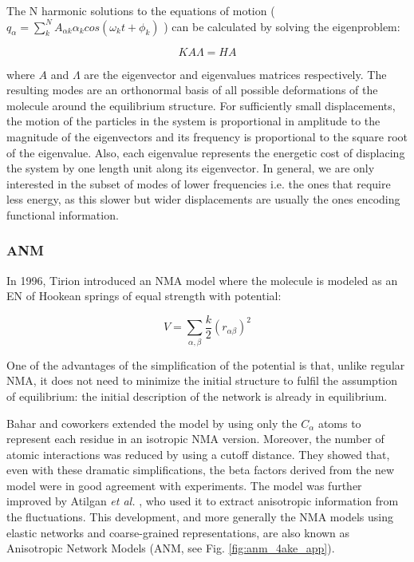 The N harmonic solutions to the equations of motion ($q_\alpha = \sum_k^N A_{\alpha k } \alpha_k cos(\omega_k t + \phi_k)$ ) can be calculated by solving the eigenproblem:

\begin{equation}
KA\Lambda = HA
\label{eq:eigenproblem}
\end{equation}

where $A$ and $\Lambda$ are the eigenvector and eigenvalues matrices respectively. The resulting modes are an orthonormal basis of all possible deformations of the molecule around the equilibrium structure. For sufficiently small displacements, the motion of the particles in the system is proportional in amplitude to the magnitude of the eigenvectors and its frequency is proportional to the square root of the eigenvalue. Also, each eigenvalue represents the energetic cost of displacing the system by one length unit along its eigenvector. In general, we are only interested in the subset of modes of lower frequencies i.e. the ones that require less energy, as this slower but wider displacements are usually the ones encoding functional information. 

\subsubsection{ANM}
\label{sec:anm_is_good}

In 1996, Tirion \cite{tirion_large_1996} introduced an NMA model where the molecule is modeled as an EN of Hookean springs of equal strength with potential:

\begin{equation}
V = \sum _{\alpha, \beta} \frac {k}{2} (r_{\alpha\beta}) ^2
\end{equation}

One of the advantages of the simplification of the potential is that, unlike regular NMA,  it does not need to minimize the initial structure to fulfil the assumption of equilibrium: the initial description of the network is already in equilibrium. 

Bahar and coworkers \cite{bahar_direct_1997} extended the model by using only the $C_\alpha$ atoms to represent each residue in an isotropic NMA version. Moreover, the number of atomic interactions was reduced by using a cutoff distance. They showed that, even with these dramatic simplifications, the beta factors derived from the new model were in good agreement with experiments. The model was further improved by Atilgan \textit{et al.} \cite{atilgan_anisotropy_2001}, who used it to extract anisotropic information from the fluctuations. This development, and more generally the NMA models using elastic networks and coarse-grained representations, are also known as Anisotropic Network Models (ANM, see Fig. \ref{fig:anm_4ake_app}).

